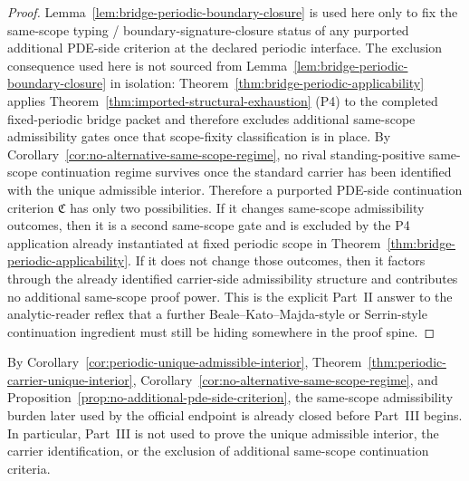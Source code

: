 \begin{proof}
Lemma~\ref{lem:bridge-periodic-boundary-closure} is used here only to fix the same-scope typing /
boundary-signature-closure status of any purported additional PDE-side criterion at the declared
periodic interface. The exclusion consequence used here is not sourced from Lemma~\ref{lem:bridge-periodic-boundary-closure} in isolation: Theorem~\ref{thm:bridge-periodic-applicability} applies
Theorem~\ref{thm:imported-structural-exhaustion} (P4) to the completed fixed-periodic bridge
packet and therefore excludes additional same-scope admissibility gates once that scope-fixity
classification is in place. By Corollary~\ref{cor:no-alternative-same-scope-regime}, no rival
standing-positive same-scope continuation regime survives once the standard carrier has been
identified with the unique admissible interior. Therefore a purported PDE-side continuation criterion
$\mathfrak C$ has only two possibilities. If it changes same-scope admissibility outcomes, then it is a
second same-scope gate and is excluded by the P4 application already instantiated at fixed periodic
scope in Theorem~\ref{thm:bridge-periodic-applicability}. If it does not change those outcomes,
then it factors through the already identified carrier-side admissibility structure and contributes no
additional same-scope proof power. This is the explicit Part~II answer to the analytic-reader reflex
that a further Beale--Kato--Majda-style or Serrin-style continuation ingredient must still be hiding
somewhere in the proof spine.
\end{proof}

\begin{manualcorollary}
\label{cor:no-circular-burden-after-carrier-packet}
By Corollary~\ref{cor:periodic-unique-admissible-interior}, Theorem~\ref{thm:periodic-carrier-unique-interior}, Corollary~\ref{cor:no-alternative-same-scope-regime}, and Proposition~\ref{prop:no-additional-pde-side-criterion}, the same-scope admissibility burden later used by the official endpoint is already closed before Part~III begins. In particular, Part~III is not used to prove the unique admissible interior, the carrier identification, or the exclusion of additional same-scope continuation criteria.
\end{manualcorollary}

